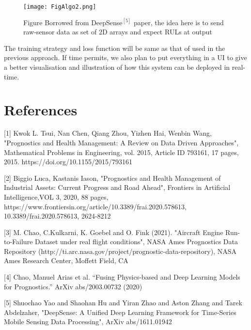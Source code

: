 \documentclass[a4paper,12pt]{article}
\begin{document}
\begin{figure}[h]
\centering
\texttt{[image: FigAlgo2.png]}
\caption{Figure Borrowed from DeepSense\(^{[5]}\) paper, the idea here is to send raw-sensor data as set of 2D arrays and expect RULs at output}
\end{figure}
The training strategy and loss function will be same as that of used in the previous approach.
If time permits, we also plan to put everything in a UI to give a better visualisation and illustration of how this system can be deployed in real-time.

\section*{References}

\medskip
\small
[1] Kwok L. Tsui, Nan Chen, Qiang Zhou, Yizhen Hai, Wenbin Wang, "Prognostics and Health Management: A Review on Data Driven Approaches", Mathematical Problems in Engineering, vol. 2015, Article ID 793161, 17 pages, 2015. https://doi.org/10.1155/2015/793161

[2] Biggio Luca, Kastanis Iason, "Prognostics and Health Management of Industrial Assets: Current Progress and Road Ahead", Frontiers in Artificial Intelligence,VOL 3, 2020, 88 pages, https://www.frontiersin.org/article/10.3389/frai.2020.578613, 10.3389/frai.2020.578613, 2624-8212   

[3] M. Chao, C.Kulkarni, K. Goebel and O. Fink (2021). "Aircraft Engine Run-to-Failure Dataset under real flight conditions", NASA Ames Prognostics Data Repository (http://ti.arc.nasa.gov/project/prognostic-data-repository), NASA Ames Research Center, Moffett Field, CA

[4] Chao, Manuel Arias et al. “Fusing Physics-based and Deep Learning Models for Prognostics.” ArXiv abs/2003.00732 (2020)

[5] Shuochao Yao and Shaohan Hu and Yiran Zhao and Aston Zhang and Tarek Abdelzaher, "DeepSense: A Unified Deep Learning Framework for Time-Series Mobile Sensing Data Processing", ArXiv abs/1611.01942






\end{document}
